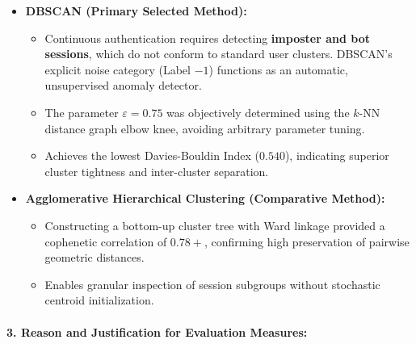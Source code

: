 \documentclass[11pt]{article}
\providecommand{\tightlist}{%
      \setlength{\itemsep}{0pt}\setlength{\parskip}{0pt}}
\begin{document}
\begin{itemize}
\tightlist
\item
  \textbf{DBSCAN (Primary Selected Method):}

  \begin{itemize}
  \tightlist
  \item
    Continuous authentication requires detecting \textbf{imposter and
    bot sessions}, which do not conform to standard user clusters.
    DBSCAN's explicit noise category (Label \(-1\)) functions as an
    automatic, unsupervised anomaly detector.
  \item
    The parameter \(\varepsilon = 0.75\) was objectively determined
    using the \(k\)-NN distance graph elbow knee, avoiding arbitrary
    parameter tuning.
  \item
    Achieves the lowest Davies-Bouldin Index (\(0.540\)), indicating
    superior cluster tightness and inter-cluster separation.
  \end{itemize}
\item
  \textbf{Agglomerative Hierarchical Clustering (Comparative Method):}

  \begin{itemize}
  \tightlist
  \item
    Constructing a bottom-up cluster tree with Ward linkage provided a
    cophenetic correlation of \(0.78+\), confirming high preservation of
    pairwise geometric distances.
  \item
    Enables granular inspection of session subgroups without stochastic
    centroid initialization.
  \end{itemize}
\end{itemize}

\paragraph{3. Reason and Justification for Evaluation
Measures:}\label{reason-and-justification-for-evaluation-measures}
\end{document}
